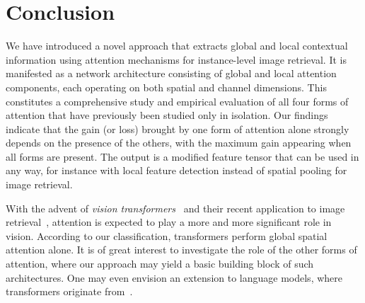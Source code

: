 \section{Conclusion}
\label{sec:conclusion}

We have introduced a novel approach that extracts global and local contextual information using attention mechanisms for instance-level image retrieval. It is manifested as a network architecture consisting of global and local attention components, each operating on both spatial and channel dimensions. This constitutes a comprehensive study and empirical evaluation of all four forms of attention that have previously been studied only in isolation. Our findings indicate that the gain (or loss) brought by one form of attention alone strongly depends on the presence of the others, with the maximum gain appearing when all forms are present. The output is a modified feature tensor that can be used in any way, for instance with local feature detection instead of spatial pooling for image retrieval.

With the advent of \emph{vision transformers}~\cite{dosovitskiy2020image,2101.11986} and their recent application to image retrieval~\cite{2102.05644}, attention is expected to play a more and more significant role in vision. According to our classification, transformers perform global spatial attention alone. It is of great interest to investigate the role of the other forms of attention, where our approach may yield a basic building block of such architectures. One may even envision an extension to language models, where transformers originate from~\cite{VSP+17}.
